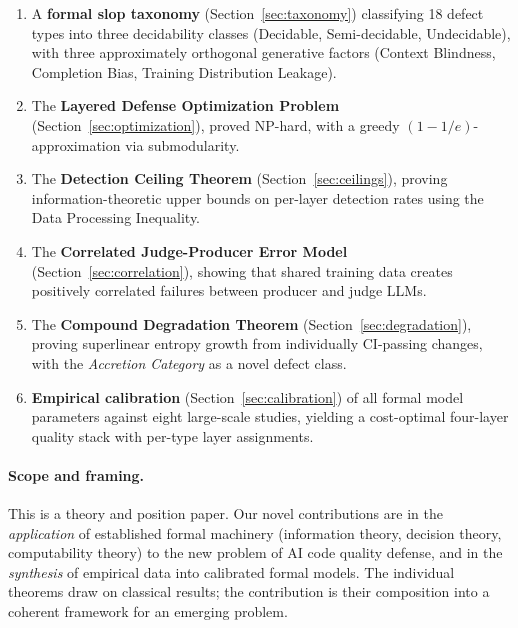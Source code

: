 \documentclass[11pt, a4paper]{article}
\theoremstyle{definition}
\theoremstyle{remark}
\begin{document}
\begin{enumerate}[leftmargin=2em]
\item A \textbf{formal slop taxonomy} (Section~\ref{sec:taxonomy}) classifying 18 defect types into three decidability classes (Decidable, Semi-decidable, Undecidable), with three approximately orthogonal generative factors (Context Blindness, Completion Bias, Training Distribution Leakage).

\item The \textbf{Layered Defense Optimization Problem} (Section~\ref{sec:optimization}), proved NP-hard, with a greedy $(1-1/e)$-approximation via submodularity.

\item The \textbf{Detection Ceiling Theorem} (Section~\ref{sec:ceilings}), proving information-theoretic upper bounds on per-layer detection rates using the Data Processing Inequality.

\item The \textbf{Correlated Judge-Producer Error Model} (Section~\ref{sec:correlation}), showing that shared training data creates positively correlated failures between producer and judge LLMs.

\item The \textbf{Compound Degradation Theorem} (Section~\ref{sec:degradation}), proving superlinear entropy growth from individually CI-passing changes, with the \emph{Accretion Category} as a novel defect class.

\item \textbf{Empirical calibration} (Section~\ref{sec:calibration}) of all formal model parameters against eight large-scale studies, yielding a cost-optimal four-layer quality stack with per-type layer assignments.
\end{enumerate}

\paragraph{Scope and framing.} This is a theory and position paper. Our novel contributions are in the \emph{application} of established formal machinery (information theory, decision theory, computability theory) to the new problem of AI code quality defense, and in the \emph{synthesis} of empirical data into calibrated formal models. The individual theorems draw on classical results; the contribution is their composition into a coherent framework for an emerging problem.


\end{document}
